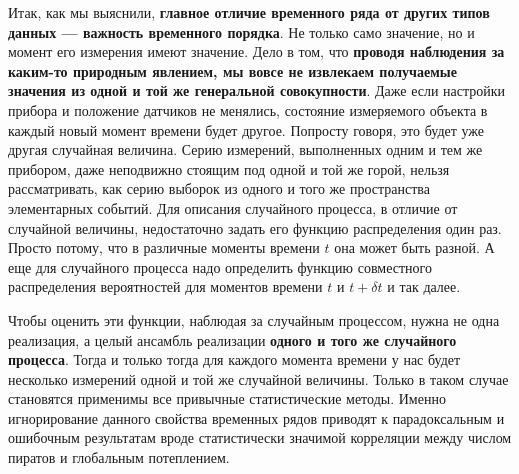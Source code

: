 

Итак, как мы выяснили, \textbf{главное отличие временного ряда от
  других типов данных — важность
временного порядка}. Не только само значение, но и момент его
измерения имеют значение. Дело в том, что \textbf{проводя наблюдения за
  каким-то природным явлением, мы вовсе не
  извлекаем получаемые значения из одной и той же генеральной
совокупности}. Даже если
настройки прибора и положение датчиков не менялись, состояние
измеряемого объекта в каждый новый момент времени будет другое.
Попросту говоря, это будет уже другая случайная величина. Серию
измерений, выполненных одним и тем же прибором, даже неподвижно
стоящим под одной и той же горой, нельзя рассматривать, как серию
выборок из одного и того же пространства элементарных событий. Для
описания случайного процесса, в отличие от случайной величины,
недостаточно задать его функцию
распределения один раз. Просто потому, что в различные моменты времени
$t$ она может быть разной. А еще для случайного процесса надо
определить функцию совместного распределения вероятностей для
моментов времени $t$ и $t+\delta t$ и так далее.

Чтобы оценить эти функции, наблюдая за случайным процессом, нужна не
одна реализация, а целый
ансамбль реализации \textbf{одного и того же случайного процесса}. Тогда
и только тогда для каждого момента времени у нас будет несколько
измерений одной и той же случайной величины. Только в таком случае
становятся применимы все привычные статистические методы. Именно
игнорирование данного свойства временных рядов приводят к
парадоксальным и ошибочным результатам вроде статистически значимой корреляции
между числом пиратов и глобальным потеплением.

